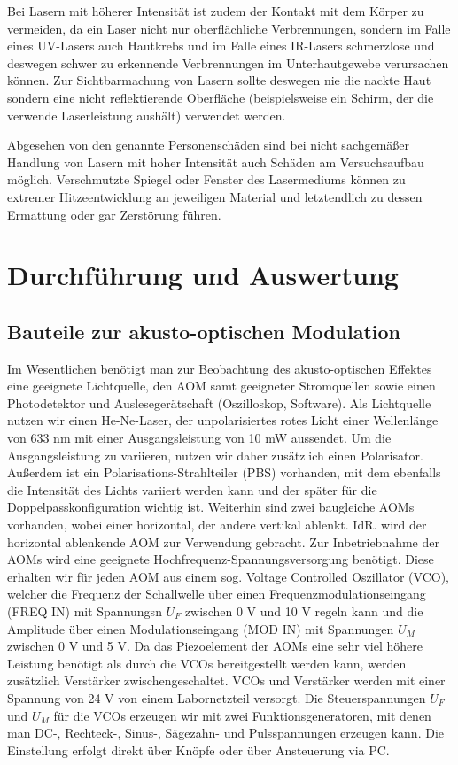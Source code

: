 \documentclass[bigchapter,colorback,accentcolor=tud4b,linedtoc,11pt]{tudreport}
\begin{document}
Bei Lasern mit höherer Intensität ist zudem der Kontakt mit dem Körper zu vermeiden, da ein Laser nicht nur oberflächliche Verbrennungen, sondern im Falle eines UV-Lasers auch Hautkrebs und im Falle eines IR-Lasers schmerzlose und deswegen schwer zu erkennende Verbrennungen im Unterhautgewebe verursachen können. Zur Sichtbarmachung von Lasern sollte deswegen nie die nackte Haut sondern eine nicht reflektierende Oberfläche (beispielsweise ein Schirm, der die verwende Laserleistung aushält) verwendet werden.

Abgesehen von den genannte Personenschäden sind bei nicht sachgemäßer Handlung von Lasern mit hoher Intensität auch Schäden am Versuchsaufbau möglich. Verschmutzte Spiegel oder Fenster des Lasermediums können zu extremer Hitzeentwicklung an jeweiligen Material und letztendlich zu dessen Ermattung oder gar Zerstörung führen. \cite{GefahrenLaser}

\chapter{Durchführung und Auswertung} %

\section{Bauteile zur akusto-optischen Modulation}

Im Wesentlichen benötigt man zur Beobachtung des akusto-optischen Effektes eine geeignete Lichtquelle, den AOM samt geeigneter Stromquellen sowie einen Photodetektor und Auslesegerätschaft (Oszilloskop, Software). Als Lichtquelle nutzen wir einen He-Ne-Laser, der unpolarisiertes rotes Licht einer Wellenlänge von 633 nm mit einer Ausgangsleistung von 10 mW aussendet. Um die Ausgangsleistung zu variieren, nutzen wir daher zusätzlich einen Polarisator. Außerdem ist ein Polarisations-Strahlteiler (PBS) vorhanden, mit dem ebenfalls die Intensität des Lichts variiert werden kann und der später für die Doppelpasskonfiguration wichtig ist. Weiterhin sind zwei baugleiche AOMs vorhanden, wobei einer horizontal, der andere vertikal ablenkt. IdR. wird der horizontal ablenkende AOM zur Verwendung gebracht. Zur Inbetriebnahme der AOMs wird eine geeignete Hochfrequenz-Spannungsversorgung benötigt. Diese erhalten wir für jeden AOM aus einem sog. Voltage Controlled Oszillator (VCO), welcher die Frequenz der Schallwelle über einen Frequenzmodulationseingang (FREQ IN) mit Spannungsn $U_F$ zwischen 0 V und 10 V regeln kann und die Amplitude über einen Modulationseingang (MOD IN) mit Spannungen $U_M$ zwischen 0 V und 5 V. Da das Piezoelement der AOMs eine sehr viel höhere Leistung benötigt als durch die VCOs bereitgestellt werden kann, werden zusätzlich Verstärker zwischengeschaltet. VCOs und Verstärker werden mit einer Spannung von 24 V von einem Labornetzteil versorgt. Die Steuerspannungen $U_F$ und $U_M$ für die VCOs erzeugen wir mit zwei Funktionsgeneratoren, mit denen man DC-, Rechteck-, Sinus-, Sägezahn- und Pulsspannungen erzeugen kann. Die Einstellung erfolgt direkt über Knöpfe oder über Ansteuerung via PC.
\end{document}
